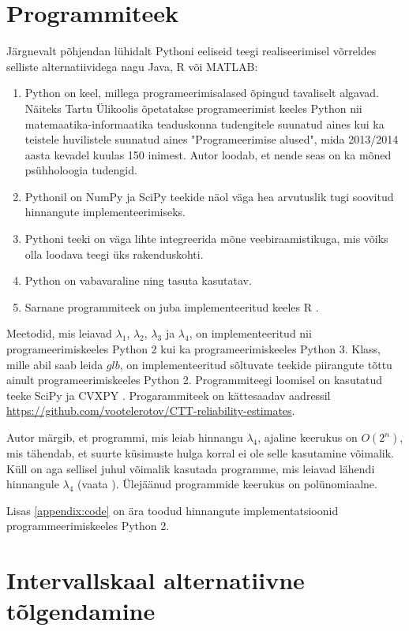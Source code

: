 \documentclass[a4paper,12pt,oneside]{article}
\numberwithin{equation}{section}
\theoremstyle{definition}
\begin{document}
\section{Programmiteek}

Järgnevalt põhjendan lühidalt Pythoni eeliseid teegi realiseerimisel võrreldes selliste alternatiividega nagu Java, R või MATLAB:
\begin{enumerate}
\item Python on keel, millega programeerimisalased õpingud tavaliselt algavad. Näiteks Tartu Ülikoolis õpetatakse programeerimist keeles Python nii mate\-maatika-informaatika teaduskonna tudengitele suunatud aines kui ka teistele huvilistele suunatud aines "Programeerimise alused", mida 2013/2014 aasta kevadel kuulas 150 inimest. Autor loodab, et nende seas on ka mõned psühholoogia tudengid.
\item Pythonil on NumPy ja SciPy teekide näol väga hea arvutuslik tugi soovitud hinnangute implementeerimiseks.
\item Pythoni teeki on väga lihte integreerida mõne veebiraamistikuga, mis võiks olla loodava teegi üks rakenduskohti.
\item Python on vabavaraline ning tasuta kasutatav.
\item Sarnane programmiteek on juba implementeeritud  keeles R \cite{Revelle2014}.
\end{enumerate}

Meetodid, mis leiavad $\lambda_1$, $\lambda_2$, $\lambda_3$ ja $\lambda_4$, on implementeeritud nii programeerimiskeeles Python 2 kui ka programeerimiskeeles Python 3. Klass, mille abil saab leida $glb$, on implementeeritud sõltuvate teekide piirangute tõttu ainult programeerimiskeeles Python 2.  Programmiteegi loomisel on kasutatud teeke SciPy \cite{JonesE.;OliphantT;Peterson} ja CVXPY \cite{DiamondS;ChuE;Boyd2014}.
Progarammiteek on kättesaadav aadressil \url{https://github.com/vootelerotov/CTT-reliability-estimates}.

Autor märgib, et programmi, mis leiab hinnangu $\lambda_4$, ajaline keerukus on $O \left( 2^n \right)$, mis tähendab, et suurte küsimuste hulga korral ei ole selle kasutamine võimalik. Küll on aga sellisel juhul võimalik kasutada programme, mis leiavad lähendi hinnangule $\lambda_4$ (vaata \cite{Benton2013}). Ülejäänud programmide keerukus on polünomiaalne. 

Lisas \ref{appendix:code} on ära toodud hinnangute implementatsioonid programmeerimiskeeles Python 2.


\section{Intervallskaal alternatiivne tõlgendamine}
\end{document}
